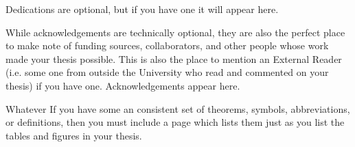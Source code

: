 \begin{dedication}
Dedications are optional, but if you have one it will appear here.
\end{dedication}

\begin{acknowledgements}
While acknowledgements are technically optional, they are also the perfect place to make note of funding sources, collaborators, and other people whose work made your thesis possible.  This is also the place to mention an External Reader (i.e. some one from outside the University who read and commented on your thesis) if you have one.  Acknowledgements appear here.
\end{acknowledgements}

\tableofcontents
\listoftables
\listoffigures

\begin{listof}{Whatever}
If you have some an consistent set of theorems, symbols, abbreviations, or definitions, then you must include a page which lists them just as you list the tables and figures in your thesis.
\end{listof}


\endinput
